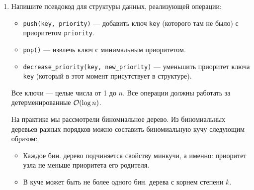 \begin{enumerate}
  \item
    Напишите псевдокод для структуры данных, реализующей операции:
    \begin{itemize}
      \item \texttt{push(key, priority)} --- добавить ключ \texttt{key} (которого там не было) с приоритетом \texttt{priority}.
      \item \texttt{pop()} --- извлечь ключ с минимальным приоритетом.
      \item \texttt{decrease\_priority(key, new\_priority)} --- уменьшить приоритет ключа \texttt{key} (который в этот момент присутствует в структуре).
    \end{itemize}
    Все ключи --- целые числа от 1 до $n$. Все операции должны работать за детерменированные $\mathcal{O}(\log{n})$.
    \begin{solution}
      На практике мы рассмотрели биномиальное дерево. Из биномиальных деревьев разных порядков можно составить биномиальную кучу следующим образом:
      \begin{itemize}
        \item Каждое бин. дерево подчиняется свойству минкучи, а именно: приоритет узла не меньше приоритета его родителя.
        \item В куче может быть не более одного бин. дерева с корнем степени $k$.
      \end{itemize}
      

    \end{solution}


	
	

\end{enumerate}